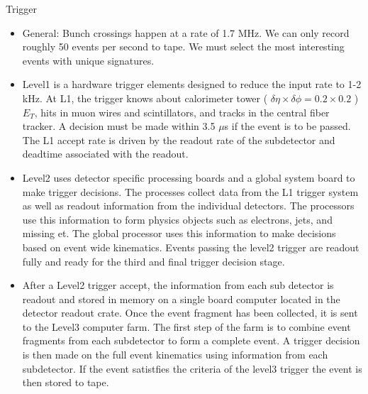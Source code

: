 Trigger
\begin{itemize}
\item General: Bunch crossings happen at a rate of 1.7 MHz. We can only record roughly 50 events per second to tape. We must select the most interesting events with unique signatures.
\item Level1 is a hardware trigger elements designed to reduce the input rate to 1-2 kHz. At L1, the trigger knows about calorimeter tower ( $\delta\eta \times \delta\phi = 0.2 \times 0.2$ )$E_{T}$, hits in muon wires and scintillators, and tracks in the central fiber tracker. A decision must be made within 3.5 $\mu$s if the event is to be passed. The L1 accept rate is driven by the readout rate of the subdetector and deadtime associated with the readout.
\item Level2 uses detector specific processing boards and a global system board to make trigger decisions. The processes collect data from the L1 trigger system as well as readout information from the individual detectors. The processors use this information to form physics objects such as electrons, jets, and missing et. The global processor uses this information to make decisions based on event wide kinematics. Events passing the level2 trigger are readout fully and ready for the third and final trigger decision stage.
\item After a Level2 trigger accept, the information from each sub detector is readout and stored in memory on a single board computer located in the detector readout crate. Once the event fragment has been collected, it is sent to the Level3 computer farm. The first step of the farm is to combine event fragments from each subdetector to form a complete event. A trigger decision is then made on the full event kinematics using information from each subdetector. If the event satistfies the criteria of the level3 trigger the event is then stored to tape.
\end{itemize}


